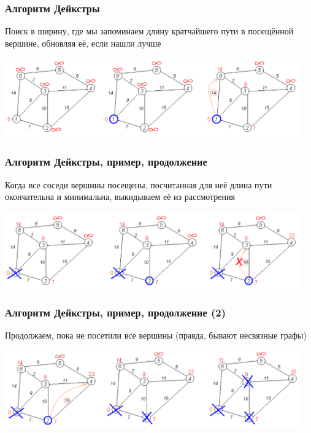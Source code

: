 \documentclass[xetex,mathserif,serif]{beamer}
\begin{document}
	\begin{frame}
		\frametitle{Алгоритм Дейкстры}
		Поиск в ширину, где мы запоминаем длину кратчайшего пути в посещённой вершине, обновляя её, если нашли лучше
		\begin{center}
			\includegraphics[width=0.95\textwidth]{dijkstra1.png}
		\end{center}
	\end{frame}

	\begin{frame}
		\frametitle{Алгоритм Дейкстры, пример, продолжение}
		Когда все соседи вершины посещены, посчитанная для неё длина пути окончательна и минимальна, выкидываем её из рассмотрения
		\begin{center}
			\includegraphics[width=0.95\textwidth]{dijkstra2.png}
		\end{center}
	\end{frame}

	\begin{frame}
		\frametitle{Алгоритм Дейкстры, пример, продолжение (2)}
		Продолжаем, пока не посетили все вершины (правда, бывают несвязные графы)
		\begin{center}
			\includegraphics[width=0.95\textwidth]{dijkstra3.png}
		\end{center}
	\end{frame}
\end{document}
